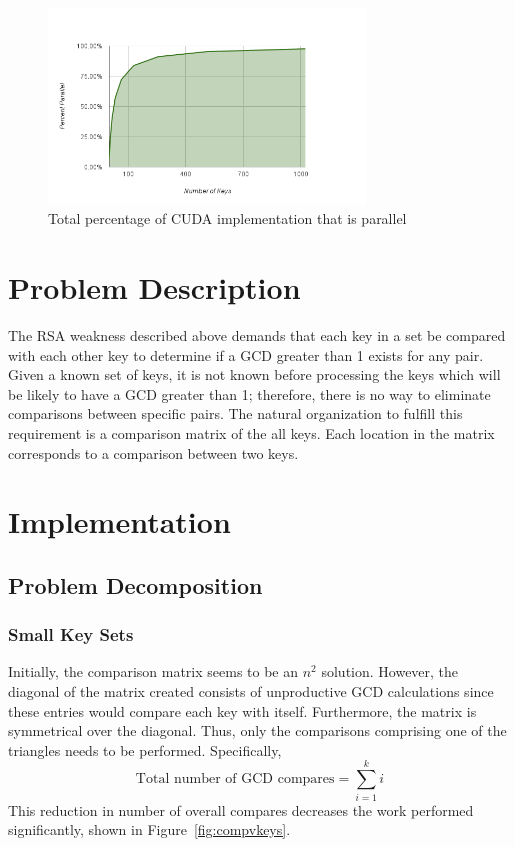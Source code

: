 \documentclass[smallextended]{svjour3}       %
\begin{document}
\begin{figure}
   \centering
   \includegraphics[width=0.75\textwidth]{chart_7}
   \caption{Total percentage of CUDA implementation that is parallel}
   \label{fig:parPercent}
\end{figure}


\section{Problem Description}
\label{sec:probdesc}
The RSA weakness described above demands that each key in a set be 
compared with each other key to determine if a GCD greater than 1 exists for 
any pair. Given a known set of keys, it is not known before processing 
the keys which will be likely to have a GCD greater than 1; therefore, there 
is no way to eliminate comparisons between specific pairs. The natural 
organization to fulfill this requirement is a comparison matrix of the all 
keys. Each location in the matrix corresponds to a comparison between two 
keys.


\section{Implementation}
\label{sec:impl}

\subsection{Problem Decomposition}
\label{subsec:probdecomp}

\subsubsection{Small Key Sets}
\label{subsubsec:smallsets}
Initially, the comparison matrix seems to be an $n^2$ solution. However, the 
diagonal of the matrix created consists of unproductive GCD calculations since 
these entries would compare each key with itself. Furthermore, the matrix is 
symmetrical over the diagonal. Thus, only the comparisons comprising one of 
the triangles needs to be performed. Specifically, 
\begin{equation}
   \mbox{Total number of GCD compares} = \sum_{i=1}^k i
   \label{eq:gcd}
\end{equation}
This reduction in number of overall compares decreases the work 
performed significantly, shown in Figure~\ref{fig:compvkeys}. 
\end{document}
